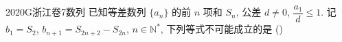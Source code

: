 
\begin{problem}{2020}{G}{浙江卷}{7}{数列}
已知等差数列 $ \{a_n\} $ 的前 $ n $ 项和 $ S_n $, 公差 $ d\neq 0 $, $ \dfrac{a_1}{d}\leq 1 $. 记 $ b_1=S_2 $, $ b_{n+1}=S_{2n+2}-S_{2n} $, $ n\in\mathbb{N}^* $, 下列等式不可能成立的是 (\hspace{1cm})

\begin{choices}
\end{choices}
\end{problem}

\begin{answer}

\end{answer}

\begin{solutions}

\end{solutions}